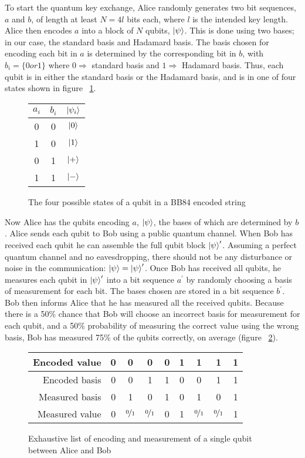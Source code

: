 To start the quantum key exchange, Alice randomly generates two bit sequences, $a$ and $b$, of length at least $N = 4l$ bits each, where $l$ is the intended key length. 
Alice then encodes $a$ into a block of $N$ qubits, $\ket{\psi}$.
This is done using two bases; in our case, the standard basis and Hadamard basis.
The basis chosen for encoding each bit in $a$ is determined by the corresponding bit in $b$, with $b_i = \{0 or 1\}$ where $0 \Rightarrow$ standard basis and $1 \Rightarrow$ Hadamard basis.
Thus, each qubit is in either the standard basis or the Hadamard basis, and is in one of four states shown in figure ~\ref{fig:possible_states}.
\begin{figure}[htp]
\centering
\begin{tabular}{|c|c|c|}
\hline
$a_i$ & $b_i$ & $\ket{\psi_i}$ \\ \hline
0 & 0 & $\ket{0}$ \\ \hline
1 & 0 & $\ket{1}$ \\ \hline
0 & 1 & $\ket{+}$ \\ \hline
1 & 1 & $\ket{-}$ \\ \hline
\end{tabular}
\caption{The four possible states of a qubit in a BB84 encoded string}
\label{fig:possible_states}
\end{figure}
Now Alice has the qubits encoding $a$, $\ket{\psi}$, the bases of which are determined by $b$.
Alice sends each qubit to Bob using a public quantum channel.
When Bob has received each qubit he can assemble the full qubit block $\ket{\psi}^\prime$.
Assuming a perfect quantum channel and no eavesdropping, there should not be any disturbance or noise in the communication: $\ket{\psi} = \ket{\psi}^\prime$.
Once Bob has received all qubits, he measures each qubit in $\ket{\psi}^\prime$ into a bit sequence $a^\prime$ by randomly choosing a basis of measurement for each bit.
The bases chosen are stored in a bit sequence $b^\prime$.
Bob then informs Alice that he has measured all the received qubits.
Because there is a 50\% chance that Bob will choose an incorrect basis for measurement for each qubit, and a 50\% probability of measuring the correct value using the wrong basis, Bob has measured 75\% of the qubits correctly, on average (figure ~\ref{fig:possible_measurements_no_eve}).
\begin{figure}[htp]
	\centering
	\begin{tabular}{|r|c|c|c|c|c|c|c|c|}
		\hline
		Encoded value  & 0 & 0 & 0 & 0 & 1 & 1 & 1 & 1 \\ \hline
		Encoded basis  & 0 & 0 & 1 & 1 & 0 & 0 & 1 & 1 \\ \hline
		Measured basis  & 0 & 1 & 0 & 1 & 0 & 1 & 0 & 1 \\ \hline
		Measured value & 0 & $\nicefrac{0}{1}$& $\nicefrac{0}{1}$ & 0 & 1 & $\nicefrac{0}{1}$ & $\nicefrac{0}{1}$ & 1\\
		\hline
	\end{tabular}
	\caption{Exhaustive list of encoding and measurement of a single qubit between Alice and Bob}
	\label{fig:possible_measurements_no_eve}
\end{figure}

